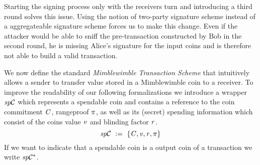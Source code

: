Starting the signing process only with the receivers turn and introducing a third round solves this issue.
Using the notion of two-party signature scheme instead of a aggregateable signature scheme forces us to make this change.
Even if the attacker would be able to sniff the pre-transaction constructed by Bob in the second round, he is missing Alice's signature for the input coins and is therefore not able to build a valid transaction.

We now define the standard \emph{Mimblewimble Transaction Scheme} that intuitively allows a sender to transfer value stored in a Mimblewimble coin to a receiver.
To improve the readability of our following formalizations we introduce a wrapper $\mathit{sp}\mathcal{C}$ which represents a spendable coin and contains a reference to the coin commitment $\mathit{C}$, rangeproof $\pi$, as well as its (secret) spending information which consist of the coins value $\mathit{v}$ and blinding factor $\mathit{r}$.
\[ \mathit{sp}\mathcal{C} ~:=~ \{ \mathit{C}, \mathit{v}, \mathit{r}, \pi \} \]
If we want to indicate that a spendable coin is a output coin of a transaction we write $\mathit{sp}\mathcal{C}^*$.

